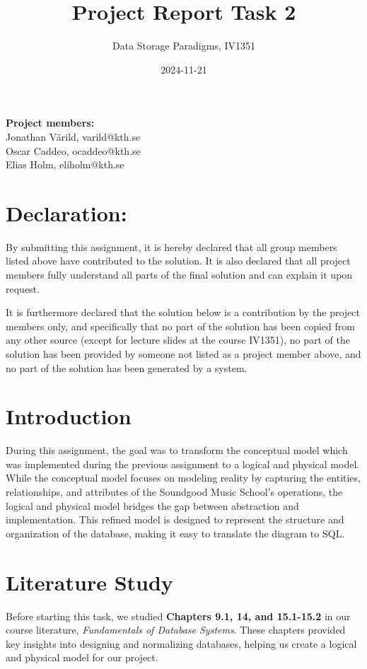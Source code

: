 \documentclass[a4paper]{scrartcl}
\title{Project Report Task 2}
\subtitle{Data Storage Paradigms, IV1351}
\author{}
\date{2024-11-21}
\begin{document}
\maketitle
\noindent\textbf{Project members:} \\ \hfill
Jonathan Värild, varild@kth.se \\ \hfill
Oscar Caddeo, ocaddeo@kth.se \\ \hfill
Elias Holm, eliholm@kth.se \\ \hfill

\section*{Declaration:}

By submitting this assignment, it is hereby declared that all group members listed above have contributed to the solution. It is also declared that all project members fully understand all parts of the final solution and can explain it upon request.

It is furthermore declared that the solution below is a contribution by the project members only, and specifically that no part of the solution has been copied from any other source (except for lecture slides at the course IV1351), no part of the solution has been provided by someone not listed as a project member above, and no part of the solution has been generated by a system.

\section{Introduction}

During this assignment, the goal was to transform the conceptual model which was implemented during the previous assignment to a logical and physical model. While the conceptual model focuses on modeling reality by capturing the entities, relationships, and attributes of the Soundgood Music School’s operations, the logical and physical model bridges the gap between abstraction and implementation. This refined model is designed to represent the structure and organization of the database, making it easy to translate the diagram to SQL.

\section{Literature Study}

Before starting this task, we studied \textbf{Chapters 9.1, 14, and 15.1-15.2} in our course literature, \textit{Fundamentals of Database Systems}. These chapters provided key insights into designing and normalizing databases, helping us create a logical and physical model for our project.
\end{document}

